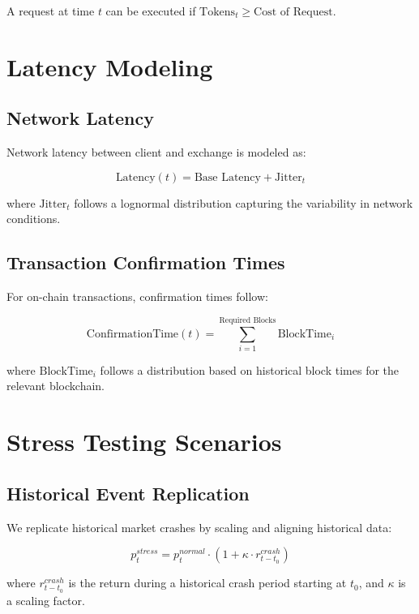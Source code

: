 \documentclass{article}
\begin{document}
A request at time $t$ can be executed if $\text{Tokens}_t \geq \text{Cost of Request}$.

\section{Latency Modeling}

\subsection{Network Latency}

Network latency between client and exchange is modeled as:

\begin{equation}
\text{Latency}(t) = \text{Base Latency} + \text{Jitter}_t
\end{equation}

where $\text{Jitter}_t$ follows a lognormal distribution capturing the variability in network conditions.

\subsection{Transaction Confirmation Times}

For on-chain transactions, confirmation times follow:

\begin{equation}
\text{ConfirmationTime}(t) = \sum_{i=1}^{\text{Required Blocks}} \text{BlockTime}_i
\end{equation}

where $\text{BlockTime}_i$ follows a distribution based on historical block times for the relevant blockchain.

\section{Stress Testing Scenarios}

\subsection{Historical Event Replication}

We replicate historical market crashes by scaling and aligning historical data:

\begin{equation}
p^{stress}_t = p^{normal}_t \cdot (1 + \kappa \cdot r^{crash}_{t-t_0})
\end{equation}

where $r^{crash}_{t-t_0}$ is the return during a historical crash period starting at $t_0$, and $\kappa$ is a scaling factor.
\end{document}
